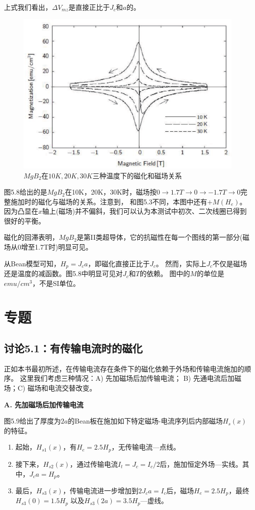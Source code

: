 上式我们看出，$\Delta V_{mz}$是直接正比于$J_c$和$a$的。
\begin{figure}[htbp]
  \centering
 \includegraphics[scale=0.7]{chpt5/figs/fig5.8.eps}
  \caption{$MgB_2$在$10K,20K,30K$三种温度下的磁化和磁场关系}\label{fig:magvfield}
\end{figure}

图5.8给出的是$MgB_2$在10K，20K，30K时，磁场按$0\rightarrow 1.7T\rightarrow 0 \rightarrow -1.7T\rightarrow 0$完整施加时的磁化与磁场的关系。注意到，
和图5.3不同，本图中还有$+M(H_e)$。因为凸显在$x$轴上(磁场)并不偏斜，我们可以认为本测试中初次、二次线圈已得到很好的平衡。

磁化的回滞表明，$MgB_2$是第II类超导体，它的抗磁性在每一个图线的第一部分(磁场从0增至1.7T时)明显可见。

从Bean模型可知，$H_p=J_c a$，即磁化直接正比于$J_c$。
然而，实际上$J_c$不仅是磁场还是温度的减函数。图5.8中明显可见对$J_c$和$T$的依赖。
图中的$M$的单位是$emu/cm^3$，不是SI单位。

\section{专题}
\subsection{讨论5.1：有传输电流时的磁化}
正如本书最初所述，在传输电流存在条件下的磁化依赖于外场和传输电流施加的顺序。
这里我们考虑三种情况：A) 先加磁场后加传输电流； B) 先通电流后加磁场；C) 磁场和电流交替改变。

\textbf{A.  先加磁场后加传输电流}

图5.9给出了厚度为$2a$的Bean板在施加如下特定磁场-电流序列后内部磁场$H_s(x)$的特征。
\begin{enumerate}
	\item 起始，$H_{s1}(x)$，有$H_e=2.5H_p$，无传输电流---点线。
	\item 接下来，$H_{s2}(x)$，通过传输电流$I_t=J_c=I_c/2$后，施加恒定外场---实线。其中，$J_c a=H_p$。
	\item 最后，$H_{s3}(x)$，传输电流进一步增加到$2J_c a=I_c$后，磁场$H_e =2.5 H_p$，最终$H_{s3}(0)=1.5 H_p$
	以及$H_{s3}(2a)=3.5H_p$---虚线。
\end{enumerate}

